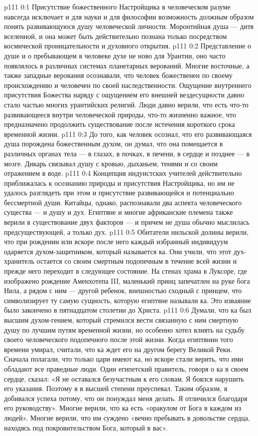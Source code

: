 \author{Одиночный Вестник}
\vs p111 0:1 Присутствие божественного Настройщика в человеческом разуме навсегда исключает и для науки и для философии возможность должным образом понять развивающуюся душу человеческой личности. Моронтийная душа --- дитя вселенной, и она может быть действительно познана только посредством космической проницательности и духовного открытия.
\vs p111 0:2 \pc Представление о душе и о пребывающем в человеке духе не ново для Урантии, оно часто появлялось в различных системах планетарных верований. Многие восточные, а также западные верования осознавали, что человек божественен по своему происхождению и человечен по своей наследственности. Ощущение внутреннего присутствия Божества наряду с ощущением его внешней вездесущности давно стало частью многих урантийских религий. Люди давно верили, что есть что\hyp{}то развивающееся внутри человеческой природы, что\hyp{}то жизненно важное, что предназначено продолжить существование после истечения короткого срока временной жизни.
\vs p111 0:3 До того, как человек осознал, что его развивающаяся душа порождена божественным духом, он думал, что она помещается в различных органах тела --- в глазах, в почках, в печени, в сердце и позднее --- в мозге. Дикарь связывал душу с кровью, дыханьем, тенями и со своим отражением в воде.
\vs p111 0:4 Концепция  индуистских учителей действительно приближалась к осознанию природы и присутствия Настройщика, но им не удалось разглядеть при этом и присутствие развивающейся и потенциально бессмертной души. Китайцы, однако, распознавали два аспекта человеческого существа ---  и  душу и дух. Египтяне и многие африканские племена также верили в существование двух факторов ---  и  причем не душа обычно мыслилась предсуществующей, а только дух.
\vs p111 0:5 Обитатели нильской долины верили, что при рождении или вскоре после него каждый избранный индивидуум одаряется духом\hyp{}защитником, который называется ка. Они учили, что этот дух\hyp{}хранитель остается со своим смертным подопечным в течение всей жизни и прежде него переходит в следующее состояние. На стенах храма в Луксоре, где изображено рождение Аменхотепа III, маленький принц запечатлен на руке бога Нила, а рядом с ним --- другой ребенок, внешностью сходный с принцем, что символизирует ту самую сущность, которую египтяне называли ка. Это изваяние было закончено в пятнадцатом столетии до Христа.
\vs p111 0:6 Думали, что ка был высшим духом\hyp{}гением, который стремился вести связанную с ним смертную душу по лучшим путям временной жизни, но особенно хотел влиять на судьбу своего человеческого подопечного после этой жизни. Когда египтянин того времени умирал, считали, что ка ждет его на другом берегу Великой Реки. Сначала полагали, что только цари имеют ка, но вскоре стали верить, что ими обладают все праведные люди. Один египетский правитель, говоря о ка в своем сердце, сказал: «Я не оставался безучастным к его словам. Я боялся нарушить его указания. Поэтому я в высшей степени преуспевал. Таким образом, я добивался успеха потому, что он понуждал меня делать. Я отличился благодаря его руководству». Многие верили, что ка есть «оракулом от Бога в каждом из людей». Многие верили, что им суждено «вечно пребывать в довольстве сердца, находясь под покровительством Бога, который в вас».
